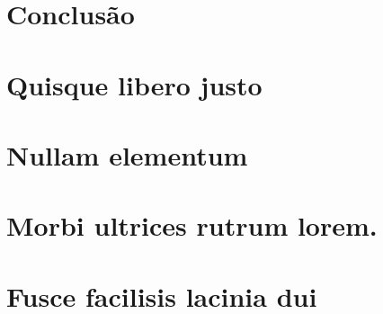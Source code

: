 \documentclass[
12pt,        %
openright,   %
twoside,     %
a4paper,     %
english,       %
brazil        %
%
%
]{ppgca}
\begin{document}
\chapter{Conclusão}

\lipsum[31-33]




%
%


\begin{apendicesenv}

\partapendices

\chapter{Quisque libero justo}

\lipsum[50]

\vfill

\pagebreak

\lipsum[51]

\chapter{Nullam elementum}
\lipsum[55-57]

\end{apendicesenv}

\begin{anexosenv}

\partanexos

\chapter{Morbi ultrices rutrum lorem.}
\lipsum[30]

\chapter{Fusce facilisis lacinia dui}

\lipsum[32]

\end{anexosenv}

\printindex
\end{document}
